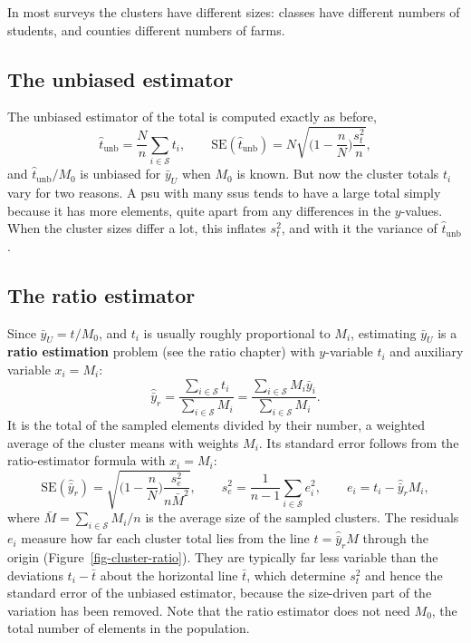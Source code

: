 \documentclass[
  letterpaper,
  DIV=11,
  numbers=noendperiod]{scrreprt}
\renewcommand{\[}{\begin{equation}}
\renewcommand{\]}{\end{equation}}
\begin{document}
In most surveys the clusters have different sizes: classes have
different numbers of students, and counties different numbers of farms.

\subsection{The unbiased estimator}\label{the-unbiased-estimator}

The unbiased estimator of the total is computed exactly as before, \[
\hat t_{\text{unb}} = \frac Nn \sum_{i\in\mathcal S} t_i, \qquad
\mathrm{SE}(\hat t_{\text{unb}}) = N\sqrt{\Big(1-\frac nN\Big)\frac{s_t^2}{n}},
\] and \(\hat t_{\text{unb}}/M_0\) is unbiased for \(\bar y_U\) when
\(M_0\) is known. But now the cluster totals \(t_i\) vary for two
reasons. A psu with many ssus tends to have a large total simply because
it has more elements, quite apart from any differences in the
\(y\)-values. When the cluster sizes differ a lot, this inflates
\(s_t^2\), and with it the variance of \(\hat t_{\text{unb}}\).

\subsection{The ratio estimator}\label{the-ratio-estimator-1}

Since \(\bar y_U = t/M_0\), and \(t_i\) is usually roughly proportional
to \(M_i\), estimating \(\bar y_U\) is a \textbf{ratio estimation}
problem (see the ratio chapter) with \(y\)-variable \(t_i\) and
auxiliary variable \(x_i = M_i\): \[
\boxed{
\hat{\bar y}_r = \frac{\sum_{i\in\mathcal S} t_i}{\sum_{i\in\mathcal S} M_i} = \frac{\sum_{i\in\mathcal S} M_i\bar y_i}{\sum_{i\in\mathcal S} M_i} .}
\] It is the total of the sampled elements divided by their number, a
weighted average of the cluster means with weights \(M_i\). Its standard
error follows from the ratio-estimator formula with \(x_i = M_i\): \[
\boxed{
\mathrm{SE}(\hat{\bar y}_r) = \sqrt{\Big(1-\frac nN\Big)\frac{s_e^2}{n\bar M^2}}, \qquad
s_e^2 = \frac{1}{n-1}\sum_{i\in\mathcal S}e_i^2, \qquad e_i = t_i-\hat{\bar y}_r M_i ,}
\] where \(\bar M = \sum_{i\in\mathcal S}M_i/n\) is the average size of
the sampled clusters. The residuals \(e_i\) measure how far each cluster
total lies from the line \(t = \hat{\bar y}_r M\) through the origin
(Figure~\ref{fig-cluster-ratio}). They are typically far less variable
than the deviations \(t_i - \bar t\) about the horizontal line
\(\bar t\), which determine \(s_t^2\) and hence the standard error of
the unbiased estimator, because the size-driven part of the variation
has been removed. Note that the ratio estimator does not need \(M_0\),
the total number of elements in the population.
\end{document}
